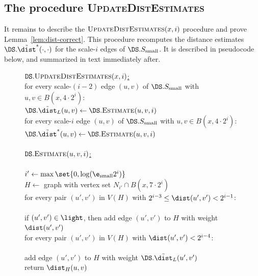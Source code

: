 \subsection{The procedure \textsc{UpdateDistEstimates}}
\label{SS:update-dists}
It remains to describe the $\textsc{UpdateDistEstimates}(x,i)$ procedure and prove Lemma~\ref{lem:dist-correct}. This procedure recomputes the distance estimates $\DS.\tilde \dist^*(\cdot, \cdot)$ for the scale-$i$ edges of $\DS.S_{\rm small}$.
It is described in pseudocode below, and summarized in text immediately after.
%
\begin{figure}[h!]
\centering
\begin{algorithm}
    \ul{$\texttt{DS}.\textsc{UpdateDistEstimates}(x,i)$:}\+
    \\      for every scale-$(i-2)$ edge $(u,v)$ of $\DS.S_{\rm small}$ with $u,v \in B(x, 4 \cdot 2^i)$:\+
    \\  $\DS.\tilde \dist_L(u,v) \gets \DS.\textsc{Estimate}(u,v,i)$\-
    \\      for every scale-$i$ edge $(u,v)$ of $\DS.S_{\rm small}$ with $u,v \in B(x, 4 \cdot 2^i)$:\+
    \\  $\DS.\tilde \dist^*(u,v) \gets \DS.\textsc{Estimate}(u,v,i)$\-\-
    \\
    \\ \ul{$\texttt{DS}.\textsc{Estimate}(u,v,i)$:}\+
    \\      
    \\      $i' \gets \max \set{0, \log (\e_{\rm small} 2^i)}$
    \\      $H \gets$ graph with vertex set $N_{i'} \cap B(x, 7 \cdot 2^i)$
    \\      for every pair $(u',v')$ in $V(H)$ with $2^{i - 3} \le \dist(u',v') < 2^{i-1}$:\+
    \\          
    \\          if $(u',v') \in \light$, then add edge $(u',v')$ to $H$ with weight $\dist(u',v')$\-
    \\      for every pair $(u',v')$ in $V(H)$ with $\dist(u',v') < 2^{i - 4}$:\+
    \\      
    \\          add edge $(u',v')$ to $H$ with weight $\DS.\tilde \dist_L(u',v')$\-
    \\      return $\dist_H(u,v)$
%
\end{algorithm}
\label{fig:update-dists}
\end{figure}
